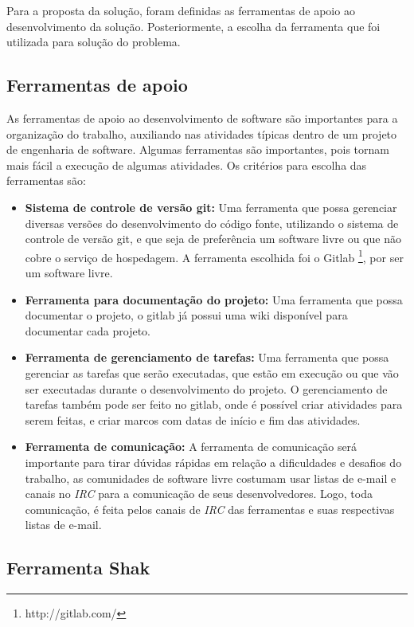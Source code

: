 Para a proposta da solução, foram definidas as ferramentas
de apoio ao desenvolvimento da solução. Posteriormente, a escolha da ferramenta
que foi utilizada para solução do problema.

\subsection{Ferramentas de apoio}

As ferramentas de apoio ao desenvolvimento de software são importantes para a
organização do trabalho, auxiliando nas atividades típicas dentro de um projeto
de engenharia de software. Algumas ferramentas são importantes, pois tornam mais fácil
a execução de algumas atividades. Os critérios para escolha das ferramentas são:

\begin{itemize}
  \item \textbf{ Sistema de controle de versão git:} Uma ferramenta que
  possa gerenciar diversas versões do desenvolvimento do código fonte, utilizando
  o sistema de controle de versão git, e que seja de preferência um software livre
  ou que não cobre o serviço de hospedagem. A ferramenta escolhida foi o Gitlab 
  \footnote{http://gitlab.com/}, por ser um software livre.
  \item \textbf{Ferramenta para documentação do projeto:} Uma ferramenta que possa
  documentar o projeto, o gitlab já possui uma wiki disponível para documentar 
  cada projeto.
  \item \textbf{Ferramenta de gerenciamento de tarefas:} Uma ferramenta que possa
  gerenciar as tarefas que serão executadas, que estão em execução ou que vão ser executadas
  durante o desenvolvimento do projeto. O gerenciamento de tarefas também pode ser
  feito no gitlab, onde é possível criar atividades para serem feitas, e criar marcos
  com datas de início e fim das atividades.
  \item \textbf{Ferramenta de comunicação:} A ferramenta de comunicação será
  importante para tirar dúvidas rápidas em relação a dificuldades e desafios do trabalho, 
  as
  comunidades de software livre costumam usar listas de e-mail e canais no \textit{IRC}
  para a comunicação de seus desenvolvedores. Logo, toda comunicação, é feita
  pelos canais de \textit{IRC} das ferramentas e suas respectivas listas de e-mail.
\end{itemize}

\subsection{Ferramenta Shak}

